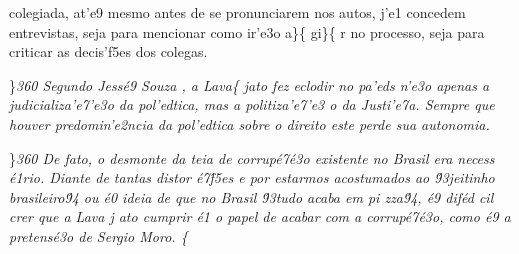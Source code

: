 colegiada, at'e9 mesmo antes de se pronunciarem nos autos, j'e1 concedem
entrevistas, seja para mencionar como ir'e3o a\}\{\rtlch{} 
\ltrch{}  gi\}\{\rtlch{}  \ltrch{}
 r no processo, seja para criticar as
decis'f5es dos colegas.
\par \}\pard \ltrpar\qj {}\sl360\widctlpar\wrapdefault\aspalpha\aspnum\faauto\adjustright{} {\rtlch{}  \ltrch{}  Segundo Jess\'e9 Souza}{\rtlch{}  
\ltrch{} \super{} }{\rtlch{}  \ltrch{}  , a Lava}\{\rtlch{}
 \ltrch{}  jato fez eclodir no
pa'eds n'e3o apenas a judicializa'e7'e3o da pol'edtica, mas a
politiza'e7'e3 o da Justi'e7a. Sempre que houver predomin'e2ncia da
pol'edtica sobre o direito este perde sua autonomia.
\par \}\pard \ltrpar\qj {}\sl360\widctlpar\wrapdefault\aspalpha\aspnum\faauto\adjustright{} {\rtlch{}  \ltrch{}  \tab De fato, o desmonte da teia de corrup\'e7\'e3o }{
\rtlch{}  \ltrch{}  existente no Brasil era necess}{\rtlch{}  \ltrch{}  \'e1rio. }{\rtlch{}  \ltrch{}  Diante de tantas distor
\'e7\'f5es}{\rtlch{}  \ltrch{}   e por estarmos acostumados ao \'93jeitinho brasileiro\'94 ou \'e0 ideia de que no Brasil \'93tudo acaba em pi}{\rtlch{}  \ltrch{}  zza\'94, \'e9 dif\'ed
cil crer que a Lava}{\rtlch{}  \ltrch{}  j}{\rtlch{}  \ltrch{}  ato cumprir}{\rtlch{}  \ltrch{}  \'e1}{\rtlch{}  \ltrch{} 
  o papel de acabar com a corrup\'e7\'e3o, como \'e9 a pretens\'e3o de Sergio Moro. }\{\rtlch{}
